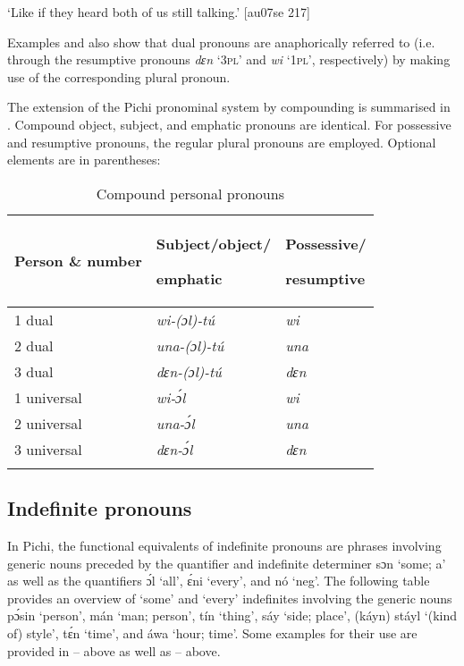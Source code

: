 \glt ‘Like if they heard both of us still talking.’ [au07se 217]
\z

Examples  and  also show that dual pronouns are anaphorically referred to (i.e. through the resumptive pronouns \textit{dɛn} ‘\textsc{3pl}’ and \textit{wi} ‘\textsc{1pl}’, respectively) by making use of the corresponding plural pronoun. 


The extension of the Pichi pronominal system by compounding is summarised in . Compound object, subject, and emphatic pronouns are identical. For possessive and resumptive pronouns, the regular plural pronouns are employed. Optional elements are in parentheses:


\begin{table}
\caption{Compound personal pronouns}
\label{tab:key:5.7}


\begin{tabularx}{\textwidth}{XXX}
\lsptoprule

Person \& number & Subject/object/

emphatic & Possessive/

resumptive\\
\midrule
1 dual & \itshape wi-(ɔl)-tú & \itshape wi\\
2 dual & \itshape una-(ɔl)-tú & \itshape una\\
3 dual & \itshape dɛn-(ɔl)-tú & \itshape dɛn\\
1 universal & \itshape wi-ɔ́l & \itshape wi\\
2 universal & \itshape una-ɔ́l & \itshape una\\
3 universal & \itshape dɛn-ɔ́l & \itshape dɛn\index{}\\
\lspbottomrule
\end{tabularx}
\end{table}
\subsection{Indefinite pronouns} \label{sec:5.4.3}

In Pichi, the functional equivalents of indefinite pronouns are phrases involving generic nouns preceded by the quantifier{\fff} and indefinite determiner sɔn ‘some; a’ as well as the quantifier{\fff}s ɔ́l ‘all’, ɛ́ni ‘every’, and nó ‘neg’. The following table provides an overview of ‘some’ and ‘every’ indefinites involving the generic nouns pɔ́sin ‘person’, mán ‘man; person’, tín ‘thing’, sáy ‘side; place’, (káyn) stáyl ‘(kind of) style’, tɛ́n ‘time’, and áwa ‘hour; time’. Some examples for their use are provided in – above as well as – above. 


